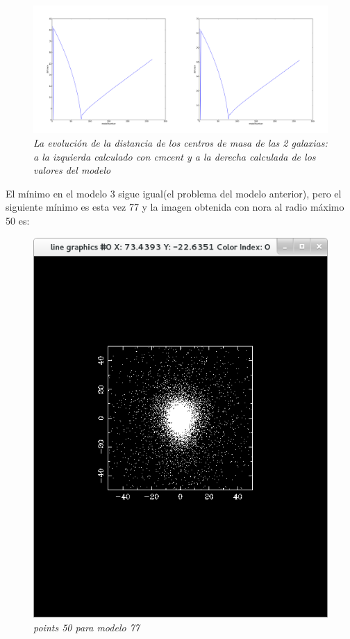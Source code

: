 \documentclass[12pt]{book}
\begin{document}
\begin{itemize}
\begin{figure}[h!]
 \centering
 \includegraphics[scale=0.2]{imgDistcon2Comb.png}
 \caption{\emph{La evolución de la distancia de los centros de masa de las 2 galaxias: a la izquierda calculado con cmcent y a la derecha calculada de los valores del modelo}}
 \label{Fig: 5}
\end{figure}
\end{itemize}

El mínimo en el modelo 3 sigue igual(el problema del modelo anterior), pero el siguiente mínimo es esta vez 77 y la imagen obtenida con nora al radio máximo 50 es:

\begin{figure}[h!]
 \centering
 \includegraphics[scale=0.5]{imgConModel77Points50.png}
 \caption{\emph{points 50 para modelo 77}}
 \label{Fig: 5}
\end{figure}
\end{document}

